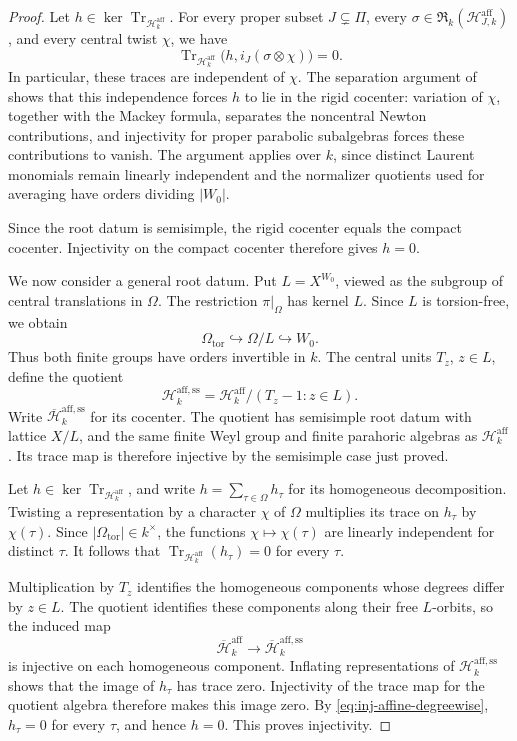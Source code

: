 \documentclass[11pt,letterpaper]{amsart}
\theoremstyle{definition}
\numberwithin{equation}{section}
\numberwithin{theorem}{section}
\newcommand{\kk}{k}
\newcommand{\cH}{\mathcal H}
\newcommand{\bH}{\overline{\mathcal H}}
\newcommand{\cR}{\mathfrak R}
\DeclareMathOperator{\Tr}{Tr}
\begin{document}
\begin{proof}
Let $h\in\ker\Tr_{\cH_\kk^{\mathrm{aff}}}$.
For every proper subset $J\subsetneq\Pi$, every
$\sigma\in\cR_\kk(\cH_{J,\kk}^{\mathrm{aff}})$,
and every central twist $\chi$, we have
\[
 \Tr_{\cH_\kk^{\mathrm{aff}}}
   \bigl(h,i_J(\sigma\otimes\chi)\bigr)=0.
\]
In particular, these traces are independent of $\chi$.
The separation argument of
\cite[Theorem~7.1]{CH} shows that this independence
forces $h$ to lie in the rigid cocenter:
variation of $\chi$, together with the Mackey
formula, separates the noncentral Newton
contributions, and injectivity for proper parabolic
subalgebras forces these contributions to vanish.
The argument applies over $\kk$, since distinct
Laurent monomials remain linearly independent and
the normalizer quotients used for averaging have
orders dividing $|W_0|$.

Since the root datum is semisimple, the rigid
cocenter equals the compact cocenter.
Injectivity on the compact cocenter therefore
gives $h=0$.

We now consider a general root datum.
Put $L=X^{W_0}$, viewed as the subgroup of central
translations in $\Omega$.
The restriction $\pi|_\Omega$ has kernel $L$.
Since $L$ is torsion-free, we obtain
\begin{equation}\label{eq:inj-affine-central-index}
 \Omega_{\mathrm{tor}}\hookrightarrow
 \Omega/L\hookrightarrow W_0.
\end{equation}
Thus both finite groups have orders invertible
in $\kk$.
The central units $T_z$, $z\in L$, define the quotient
\[
 \cH_\kk^{\mathrm{aff},\mathrm{ss}}
   =\cH_\kk^{\mathrm{aff}}/(T_z-1:z\in L).
\]
Write $\bH_\kk^{\mathrm{aff},\mathrm{ss}}$
for its cocenter.
The quotient has semisimple root datum with lattice
$X/L$, and the same finite Weyl group and finite
parahoric algebras as $\cH_\kk^{\mathrm{aff}}$.
Its trace map is therefore injective by the
semisimple case just proved.

Let $h\in\ker\Tr_{\cH_\kk^{\mathrm{aff}}}$, and write
$h=\sum_{\tau\in\Omega}h_\tau$
for its homogeneous decomposition.
Twisting a representation by a character $\chi$
of $\Omega$ multiplies its trace on $h_\tau$
by $\chi(\tau)$.
Since $|\Omega_{\mathrm{tor}}|\in\kk^\times$,
the functions $\chi\mapsto\chi(\tau)$ are
linearly independent for distinct $\tau$.
It follows that
$\Tr_{\cH_\kk^{\mathrm{aff}}}(h_\tau)=0$
for every $\tau$.

Multiplication by $T_z$ identifies the homogeneous
components whose degrees differ by $z\in L$.
The quotient identifies these components along
their free $L$-orbits, so the induced map
\begin{equation}\label{eq:inj-affine-degreewise}
 \bH_\kk^{\mathrm{aff}}
 \longrightarrow
 \bH_\kk^{\mathrm{aff},\mathrm{ss}}
\end{equation}
is injective on each homogeneous component.
Inflating representations of
$\cH_\kk^{\mathrm{aff},\mathrm{ss}}$
shows that the image of $h_\tau$ has trace zero.
Injectivity of the trace map for the quotient
algebra therefore makes this image zero.
By \eqref{eq:inj-affine-degreewise},
$h_\tau=0$ for every $\tau$, and hence $h=0$.
This proves injectivity.


\end{proof}
\end{document}

